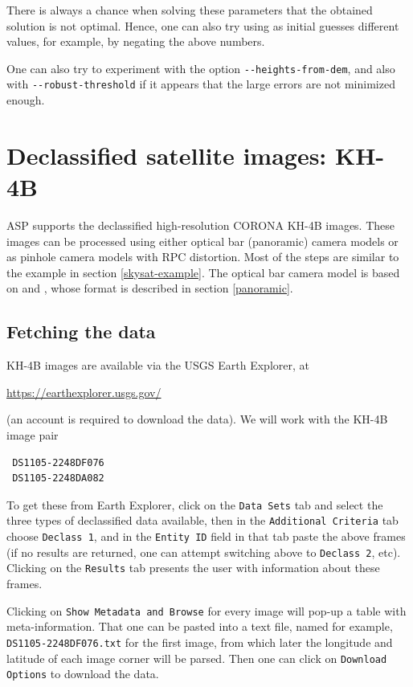 There is always a chance when solving these parameters that the obtained solution is not optimal.
Hence, one can also try using as initial guesses different values, for example, 
by negating the above numbers. 

One can also try to experiment with the option \texttt{-\/-heights-from-dem}, and also with \texttt{-\/-robust-threshold} if it appears that the large errors are not minimized enough.

\section{Declassified satellite images: KH-4B}
\label{kh4}

ASP supports the declassified high-resolution CORONA KH-4B images.
These images can be processed using either optical bar (panoramic)
camera models or as pinhole camera models with RPC distortion.
Most of the steps are similar to the example in section \ref{skysat-example}.
The optical bar camera model is based on \cite{schenk2003rigorous} and
\cite{sohn2004mathematical}, whose format is described in section
\ref{panoramic}.

\subsection{Fetching the data}

KH-4B images are available via the USGS Earth Explorer, at
\begin{center}
 \url{https://earthexplorer.usgs.gov/}
\end{center}

(an account is required to download the data). We will work with the KH-4B image pair

\begin{verbatim}
 DS1105-2248DF076
 DS1105-2248DA082
\end{verbatim}

To get these from Earth Explorer, click on the \texttt{Data Sets}
tab and select the three types of declassified data available, then in the 
\texttt{Additional Criteria} tab choose \texttt{Declass 1}, and in
the \texttt{Entity ID} field in that tab paste the above frames (if no results
are returned, one can attempt switching above to \texttt{Declass 2},
etc). Clicking on the \texttt{Results} tab presents the user with information about
these frames.

Clicking on \texttt{Show Metadata and Browse} for every
image will pop-up a table with meta-information. That one can be pasted
into a text file, named for example, \texttt{DS1105-2248DF076.txt} for the
first image, from which later the longitude and latitude of each image corner
will be parsed. Then one can click on \texttt{Download Options} 
to download the data. 

